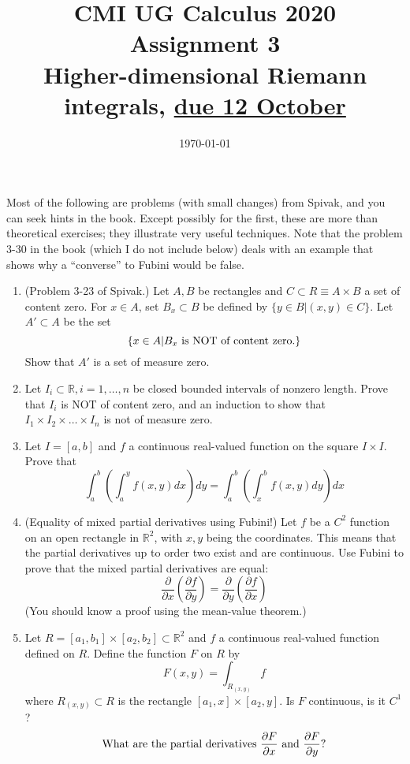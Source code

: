 \documentclass[11pt]{amsart}
\newcommand{\bbR}{\mathbb{R}}
\theoremstyle{definition}
\begin{document}
\title{CMI UG Calculus 2020 Assignment 3\\
 {\tiny Higher-dimensional Riemann integrals, \underline{due 12 October}}}
\date{\today}
\maketitle

Most of the following are problems (with small changes) from Spivak, and you can seek hints in the book. Except possibly for the first, these are more than theoretical exercises; they  illustrate very useful techniques. Note that the problem 3-30 in the book (which I do not include below) deals with an example that shows why a ``converse'' to Fubini would be false. 

\begin{enumerate}[wide, labelwidth=!, labelindent=0pt]

\item (Problem 3-23 of Spivak.) Let $A,B$ be rectangles and $C \subset R \equiv A \times B$ a set of content zero. For $x \in A$, set $B_x \subset B$ be defined by $\{y \in B|(x,y) \in C\}$.
Let $A' \subset A$ be the set
\[
\{x \in A|\textup{$B_x$ is NOT of content zero.}\}
\]
Show that $A'$ is a set of measure zero. 

\item Let $I_i \subset \bbR,i=1,\dots,n$ be closed bounded intervals of nonzero length. Prove that $I_i$ is NOT of content zero, and an induction to show that 
$I_1 \times I_2 \times \dots \times I_n$ is not of measure zero.

\item Let $I=[a,b]$ and $f$ a continuous real-valued function on the square $I \times I$. Prove that
\[
\int_a^b(\int_a^y f(x,y)dx)dy=\int_a^b(\int_x^b f(x,y)dy)dx
\] 

\item (Equality of mixed partial derivatives using Fubini!) Let $f$ be a $C^2$ function on an open rectangle in $\bbR^2$, with $x,y$ being the coordinates. This means that the partial derivatives up to order two exist  and are continuous. Use Fubini to prove that the mixed partial derivatives are equal:
$$
\frac{\partial }{ \partial x} (\frac{\partial f}{ \partial y})= \frac{\partial }{ \partial y} (\frac{\partial f}{ \partial x})
$$
(You should know a proof using the mean-value theorem.)

\item Let $R=[a_1,b_1] \times [a_2,b_2] \subset \bbR^2$ and $f$ a continuous real-valued function defined on $R$. Define the function $F$ on $R$ by
\[
F(x,y)=\int_{R_{(x,y)}} f
\]
where $R_{(x,y)} \subset R$ is the rectangle $[a_1,x] \times [a_2,y]$. Is $F$ continuous, is it $C^1$? 
\[
\textup{What are the partial derivatives $\frac{\partial F}{ \partial x}$ and $\frac{\partial F}{ \partial y}$?}
\]


\end{enumerate}
\end{document}
